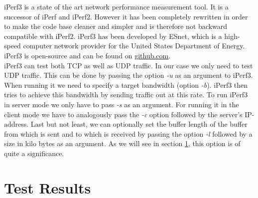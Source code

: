 iPerf3 is a state of the art network performance measurement tool. It is a successor of iPerf and iPerf2. However it has been completely rewritten in order to make the code base cleaner and simpler and is therefore not backward compatible with iPerf2. iPerf3 has been developed by \ac{ESnet}, which is a high-speed computer network provider for the United States Department of Energy. iPerf3 is open-source and can be found on \href{https://github.com/esnet/iperf}{github.com}.
\\
iPerf3 can test both \ac{TCP} as well as \acs{UDP} traffic. In our case we only need to test \acs{UDP} traffic. This can be done by passing the option \textit{-u} as an argument to iPerf3. When running it we need to specify a target bandwidth (option \textit{-b}). iPerf3 then tries to achieve this bandwidth by sending traffic out at this rate. To run iPerf3 in server mode we only have to pass \textit{-s} as an argument. For running it in the client mode we have to analogously pass the \textit{-c} option followed by the server's \acs{IP}-address. Last but not least, we can optionally set the buffer length of the buffer from which is sent and to which is received by passing the option \textit{-l} followed by a size in kilo bytes as an argument. As we will see in section \ref{Test Results}, this option is of quite a significance.

\section{Test Results}\label{Test Results}

